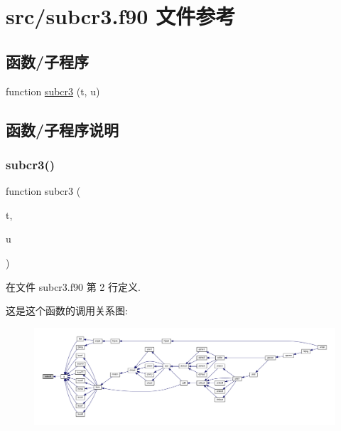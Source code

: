 \hypertarget{subcr3_8f90}{}\section{src/subcr3.f90 文件参考}
\label{subcr3_8f90}
\subsection*{函数/子程序}
\begin{DoxyCompactItemize}
\item 
function \mbox{\hyperlink{subcr3_8f90_a552129af5db338a1118e9d50e611cd46}{subcr3}} (t, u)
\end{DoxyCompactItemize}


\subsection{函数/子程序说明}
\mbox{\label{subcr3_8f90_a552129af5db338a1118e9d50e611cd46}} 
\subsubsection{\texorpdfstring{subcr3()}{subcr3()}}
{\footnotesize\ttfamily function subcr3 (\begin{DoxyParamCaption}\item[{}]{t,  }\item[{}]{u }\end{DoxyParamCaption})}



在文件 subcr3.\+f90 第 2 行定义.

这是这个函数的调用关系图\+:
\nopagebreak
\begin{figure}[H]
\begin{center}
\leavevmode
\includegraphics[width=350pt]{subcr3_8f90_a552129af5db338a1118e9d50e611cd46_icgraph}
\end{center}
\end{figure}
